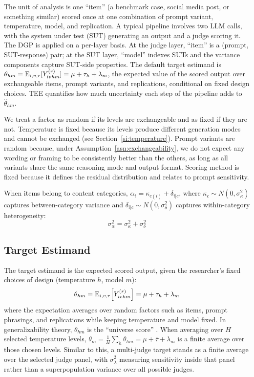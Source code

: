 The unit of analysis is one ``item'' (a benchmark case, social media post, or something similar) scored once at one combination of prompt variant, temperature, model, and replication. A typical pipeline involves two LLM calls, with the system under test (SUT) generating an output and a judge scoring it. The DGP is applied on a per-layer basis. At the judge layer, ``item'' is a (prompt, SUT-response) pair; at the SUT layer, ``model'' indexes SUTs and the variance components capture SUT-side properties. The default target estimand is $\theta_{hm} = \operatorname{E}_{i,v,r}[Y_{ivhm}^{(r)}] = \mu + \tau_h + \lambda_m$, the expected value of the scored output over exchangeable items, prompt variants, and replications, conditional on fixed design choices. TEE quantifies how much uncertainty each step of the pipeline adds to $\hat{\theta}_{hm}$.

We treat a factor as random if its levels are exchangeable and as fixed if they are not. Temperature is fixed because its levels produce different generation modes and cannot be exchanged (see Section~\ref{si:temperature}). Prompt variants are random because, under Assumption~\ref{asn:exchangeability}, we do not expect any wording or framing to be consistently better than the others, as long as all variants share the same reasoning mode and output format. Scoring method is fixed because it defines the residual distribution and relates to prompt sensitivity.

When items belong to content categories, $\alpha_i = \kappa_{c(i)} + \delta_{i|c}$, where $\kappa_c \sim N(0, \sigma^2_\kappa)$ captures between-category variance and $\delta_{i|c} \sim N(0, \sigma^2_\delta)$ captures within-category heterogeneity:
\begin{equation}
\sigma^2_\alpha = \sigma^2_\kappa + \sigma^2_\delta
\end{equation}

\subsection{Target Estimand}
\label{si:estimand}

The target estimand is the expected scored output, given the researcher's fixed choices of design (temperature $h$, model $m$):
\begin{equation}
\label{eq:estimand}
\theta_{hm} = \operatorname{E}_{i, v, r}\!\left[Y_{ivhm}^{(r)}\right] = \mu + \tau_h + \lambda_m
\end{equation}
where the expectation averages over random factors such as items, prompt phrasings, and replications while keeping temperature and model fixed. In generalizability theory, $\theta_{hm}$ is the ``universe score'' \citep{bayerl2007gtheory, brennan2001gtheory}. When averaging over $H$ selected temperature levels, $\theta_m = \frac{1}{H}\sum_h \theta_{hm} = \mu + \bar{\tau} + \lambda_m$ is a finite average over those chosen levels. Similar to this, a multi-judge target stands as a finite average over the selected judge panel, with $\sigma^2_\lambda$ measuring sensitivity inside that panel rather than a superpopulation variance over all possible judges.

